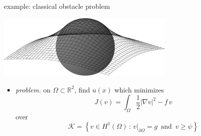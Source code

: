 \documentclass[svgnames,
               hyperref={colorlinks,citecolor=DeepPink4,linkcolor=FireBrick,urlcolor=Maroon},
               usepdftitle=false]  %
               {beamer}
\newcommand{\RR}{\mathbb{R}}
\newcommand{\grad}{\nabla}
\begin{document}
\begin{frame}{example: classical obstacle problem}

\begin{center}
\includegraphics[width=0.65\textwidth]{../talk-oxford/images/obstacle65.pdf}
\end{center}

\begin{itemize}
\item \emph{problem.} on $\Omega \subset \RR^2$, find $u(x)$ which minimizes
    $$J(v) = \int_\Omega \frac{1}{2} |\grad v|^2 - f\, v$$
over
    $$\mathcal{K} = \left\{v \in H^1(\Omega) \,:\, v\big|_{\partial \Omega} = g \,\text{ and }\, v \ge \psi\right\}$$
\end{itemize}
\end{frame}
\end{document}
